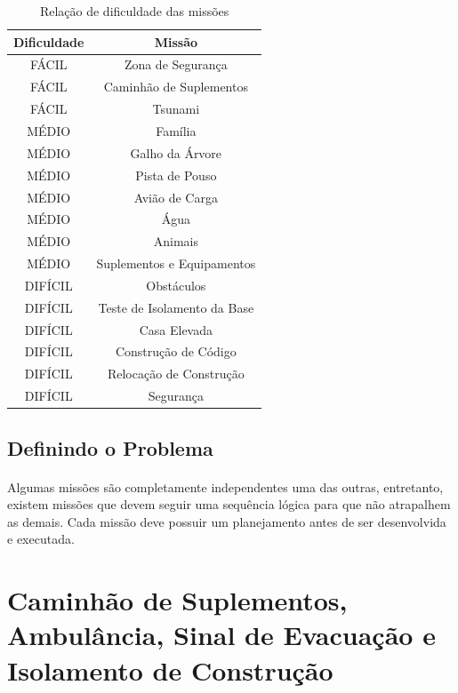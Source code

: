\documentclass{article}
\begin{document}
		\begin{table}[h!]
			\begin{center}
				\begin{tabular}{cc}
					\toprule
						Dificuldade & Missão\\
					\midrule
						FÁCIL & Zona de Segurança\\
					    FÁCIL & Caminhão de Suplementos\\
					    FÁCIL & Tsunami\\
					    MÉDIO & Família\\
					    MÉDIO & Galho da Árvore\\
					    MÉDIO & Pista de Pouso\\
					    MÉDIO & Avião de Carga\\
					    MÉDIO & Água\\
					    MÉDIO & Animais\\
					    MÉDIO & Suplementos e Equipamentos\\
						DIFÍCIL & Obstáculos\\
					    DIFÍCIL & Teste de Isolamento da Base\\
					    DIFÍCIL & Casa Elevada\\
					    DIFÍCIL & Construção de Código\\
					    DIFÍCIL & Relocação de Construção\\
					    DIFÍCIL & Segurança\\
				    \bottomrule
				\end{tabular}
				\caption{Relação de dificuldade das missões}
				\label{tab:table_dificulty}
			\end{center}
		\end{table}

	\subsection{Definindo o Problema}
		\paragraph{}
			Algumas missões são completamente independentes uma das outras, entretanto, existem missões que devem seguir uma sequência lógica para que não atrapalhem as demais. Cada missão deve possuir um planejamento antes de ser desenvolvida e executada.

\newpage
\section{Caminhão de Suplementos, Ambulância, Sinal de Evacuação e Isolamento de Construção}
\end{document}
